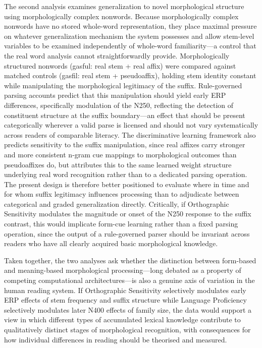\documentclass[utf8]{FrontiersinHarvard} %
\begin{document}
The second analysis examines generalization to novel morphological structure using morphologically complex nonwords. Because morphologically complex nonwords have no stored whole-word representation, they place maximal pressure on whatever generalization mechanism the system possesses and allow stem-level variables to be examined independently of whole-word familiarity—a control that the real word analysis cannot straightforwardly provide. Morphologically structured nonwords (gasful: real stem + real affix) were compared against matched controls (gasfil: real stem + pseudoaffix), holding stem identity constant while manipulating the morphological legitimacy of the suffix. Rule-governed parsing accounts predict that this manipulation should yield early ERP differences, specifically modulation of the N250, reflecting the detection of constituent structure at the suffix boundary—an effect that should be present categorically wherever a valid parse is licensed and should not vary systematically across readers of comparable literacy. The discriminative learning framework also predicts sensitivity to the suffix manipulation, since real affixes carry stronger and more consistent n-gram cue mappings to morphological outcomes than pseudoaffixes do, but attributes this to the same learned weight structure underlying real word recognition rather than to a dedicated parsing operation. The present design is therefore better positioned to evaluate where in time and for whom suffix legitimacy influences processing than to adjudicate between categorical and graded generalization directly. Critically, if Orthographic Sensitivity modulates the magnitude or onset of the N250 response to the suffix contrast, this would implicate form-cue learning rather than a fixed parsing operation, since the output of a rule-governed parser should be invariant across readers who have all clearly acquired basic morphological knowledge.

Taken together, the two analyses ask whether the distinction between form-based and meaning-based morphological processing—long debated as a property of competing computational architectures—is also a genuine axis of variation in the human reading system. If Orthographic Sensitivity selectively modulates early ERP effects of stem frequency and suffix structure while Language Proficiency selectively modulates later N400 effects of family size, the data would support a view in which different types of accumulated lexical knowledge contribute to qualitatively distinct stages of morphological recognition, with consequences for how individual differences in reading should be theorised and measured.
\end{document}
